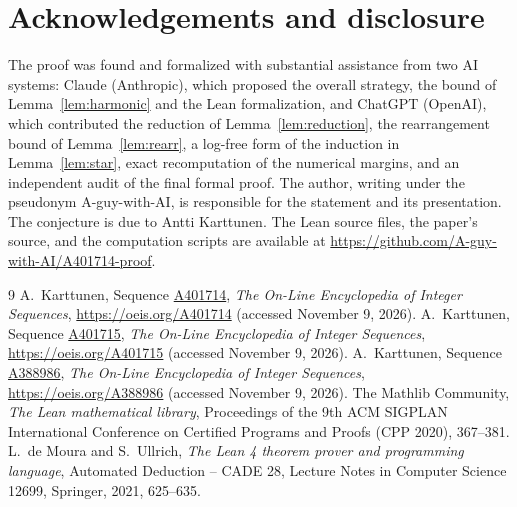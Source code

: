 \documentclass[11pt,a4paper]{amsart}
\theoremstyle{definition}
\theoremstyle{remark}
\newcommand{\oeis}[1]{\href{https://oeis.org/#1}{#1}}
\begin{document}
\section*{Acknowledgements and disclosure}

The proof was found and formalized with substantial assistance from two AI systems: Claude (Anthropic), which proposed the overall strategy, the bound of Lemma~\ref{lem:harmonic} and the Lean formalization, and ChatGPT (OpenAI), which contributed the reduction of Lemma~\ref{lem:reduction}, the rearrangement bound of Lemma~\ref{lem:rearr}, a log-free form of the induction in Lemma~\ref{lem:star}, exact recomputation of the numerical margins, and an independent audit of the final formal proof. The author, writing under the pseudonym A-guy-with-AI, is responsible for the statement and its presentation. The conjecture is due to Antti Karttunen. The Lean source files, the paper's source, and the computation scripts are available at \url{https://github.com/A-guy-with-AI/A401714-proof}.

\begin{thebibliography}{9}
 A.~Karttunen, Sequence \oeis{A401714}, \emph{The On-Line Encyclopedia of Integer Sequences}, \url{https://oeis.org/A401714} (accessed November 9, 2026).
 A.~Karttunen, Sequence \oeis{A401715}, \emph{The On-Line Encyclopedia of Integer Sequences}, \url{https://oeis.org/A401715} (accessed November 9, 2026).
 A.~Karttunen, Sequence \oeis{A388986}, \emph{The On-Line Encyclopedia of Integer Sequences}, \url{https://oeis.org/A388986} (accessed November 9, 2026).
 The Mathlib Community, \emph{The Lean mathematical library}, Proceedings of the 9th ACM SIGPLAN International Conference on Certified Programs and Proofs (CPP 2020), 367--381.
 L.~de Moura and S.~Ullrich, \emph{The Lean 4 theorem prover and programming language}, Automated Deduction -- CADE 28, Lecture Notes in Computer Science 12699, Springer, 2021, 625--635.
\end{thebibliography}
\end{document}
